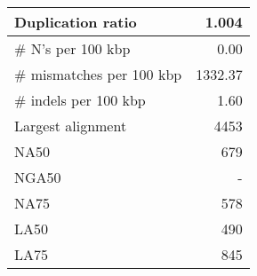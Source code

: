 \documentclass[12pt,a4paper]{article}
\begin{document}
\begin{table}[ht]
\begin{center}
\begin{tabular}{|l*{1}{|r}|}
Duplication ratio & 1.004 \\ \hline
\# N's per 100 kbp & 0.00 \\ \hline
\# mismatches per 100 kbp & 1332.37 \\ \hline
\# indels per 100 kbp & 1.60 \\ \hline
Largest alignment & 4453 \\ \hline
NA50 & 679 \\ \hline
NGA50 & - \\ \hline
NA75 & 578 \\ \hline
LA50 & 490 \\ \hline
LA75 & 845 \\ \hline
\end{tabular}
\end{center}
\end{table}
\end{document}
